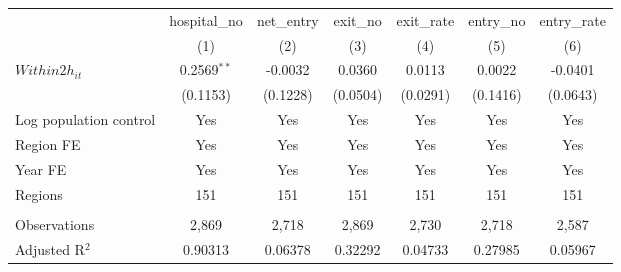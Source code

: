 \begingroup
\centering
\begin{tabular}{lcccccc}
   \toprule
                          & hospital\_no  & net\_entry  & exit\_no  & exit\_rate  & entry\_no  & entry\_rate \\    
                          & (1)           & (2)         & (3)       & (4)         & (5)        & (6)\\  
   \midrule 
   $Within2h_{it}$        & 0.2569$^{**}$ & -0.0032     & 0.0360    & 0.0113      & 0.0022     & -0.0401\\   
                          & (0.1153)      & (0.1228)    & (0.0504)  & (0.0291)    & (0.1416)   & (0.0643)\\   
   Log population control & Yes           & Yes         & Yes       & Yes         & Yes        & Yes\\  
   Region FE              & Yes           & Yes         & Yes       & Yes         & Yes        & Yes\\  
   Year FE                & Yes           & Yes         & Yes       & Yes         & Yes        & Yes\\  
   Regions                & 151           & 151         & 151       & 151         & 151        & 151\\  
    \\
   Observations           & 2,869         & 2,718       & 2,869     & 2,730       & 2,718      & 2,587\\  
   Adjusted R$^2$         & 0.90313       & 0.06378     & 0.32292   & 0.04733     & 0.27985    & 0.05967\\  
   \bottomrule
\end{tabular}
\par\endgroup
